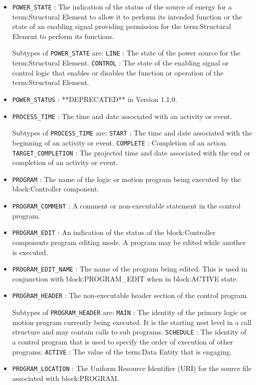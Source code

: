 \begin{itemize}
\item \texttt{POWER_STATE} : The indication of the status of the source of energy for a {term:Structural Element} to allow it to perform its intended function or the state of an enabling signal providing permission for the {term:Structural Element} to perform its functions. 

Subtypes of \texttt{POWER_STATE} are: 
\newline\tab \texttt{LINE} : The state of the power source for the {term:Structural Element}. 
\newline\tab \texttt{CONTROL} : The state of the enabling signal or control logic that enables or disables the function or operation of the {term:Structural Element}. 
\item \texttt{POWER_STATUS} : **DEPRECATED** in Version 1.1.0. 

\item \texttt{PROCESS_TIME} : The time and date associated with an activity or event. 

Subtypes of \texttt{PROCESS_TIME} are: 
\newline\tab \texttt{START} : The time and date associated with the beginning of an activity or event. 
\newline\tab \texttt{COMPLETE} : Completion of an action. 
\newline\tab \texttt{TARGET_COMPLETION} : The projected time and date associated with the end or completion of an activity or event. 
\item \texttt{PROGRAM} : The name of the logic or motion program being executed by the {block:Controller} component. 

\item \texttt{PROGRAM_COMMENT} : A comment or non-executable statement in the control program. 

\item \texttt{PROGRAM_EDIT} : An indication of the status of the {block:Controller} components program editing mode. A program may be edited while another is executed. 

\item \texttt{PROGRAM_EDIT_NAME} : The name of the program being edited. 
 This is used in conjunction with {block:PROGRAM_EDIT} when in {block:ACTIVE} state.  

\item \texttt{PROGRAM_HEADER} : The non-executable header section of the control program. 

Subtypes of \texttt{PROGRAM_HEADER} are: 
\newline\tab \texttt{MAIN} : The identity of the primary logic or motion program currently being executed. It is the starting nest level in a call structure and may contain calls to sub programs. 
\newline\tab \texttt{SCHEDULE} : The identity of a control program that is used to specify the order of execution of other programs. 
\newline\tab \texttt{ACTIVE} : The value of the {term:Data Entity} that is engaging. 
\item \texttt{PROGRAM_LOCATION} : The Uniform Resource Identifier (URI) for the source file associated with {block:PROGRAM}. 


\end{itemize}
